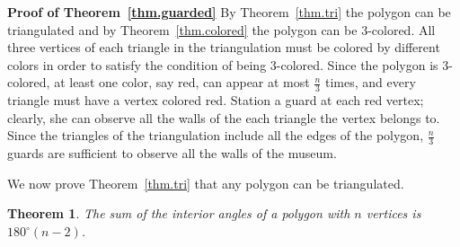 \documentclass[11pt,a4paper]{article}
\newtheorem{theorem}{Theorem}
\begin{document}
\textbf{Proof of Theorem~\ref{thm.guarded}}
By Theorem~\ref{thm.tri} the polygon can be triangulated and by Theorem~\ref{thm.colored} the polygon can be $3$-colored. All three vertices of each triangle in the triangulation must be colored by different colors in order to satisfy the condition of being $3$-colored. Since the polygon is $3$-colored, at least one color, say red, can appear at most $\frac{n}{3}$ times, and every triangle must have a vertex colored red. Station a guard at each red vertex; clearly, she can observe all the walls of the each triangle the vertex belongs to. Since the triangles of the triangulation include all the edges of the polygon, $\frac{n}{3}$ guards are sufficient to observe all the walls of the museum.

\newpage 

We now prove Theorem~\ref{thm.tri} that any polygon can be triangulated.

\begin{theorem}
The sum of the interior angles of a polygon with $n$ vertices is  $180^\circ(n-2)$.
\end{theorem}
\end{document}
